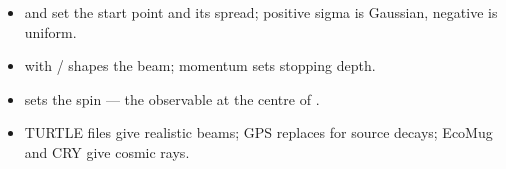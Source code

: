 \begin{recap}
\begin{itemize}
  \item {} and  set the start point and its spread; positive sigma is Gaussian, negative is uniform.
  \item {} with / shapes the beam; momentum sets stopping depth.
  \item {} sets the spin --- the observable at the centre of \muSR.
  \item TURTLE files give realistic beams; GPS replaces  for source decays; EcoMug and CRY give cosmic rays.
\end{itemize}
\end{recap}

